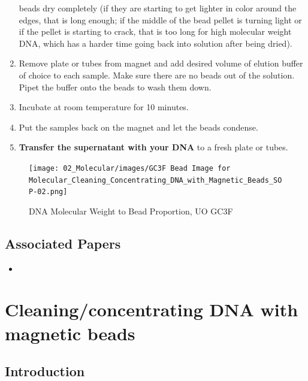 \documentclass[
  letterpaper,
  DIV=11,
  numbers=noendperiod]{scrreprt}
\providecommand{\tightlist}{%
  \setlength{\itemsep}{0pt}\setlength{\parskip}{0pt}}\usepackage{longtable,booktabs,array}
\begin{document}
\begin{enumerate}
  beads dry completely (if they are starting to get lighter in color
  around the edges, that is long enough; if the middle of the bead
  pellet is turning light or if the pellet is starting to crack, that is
  too long for high molecular weight DNA, which has a harder time going
  back into solution after being dried).
\item
  Remove plate or tubes from magnet and add desired volume of elution
  buffer of choice to each sample. Make sure there are no beads out of
  the solution. Pipet the buffer onto the beads to wash them down.
\item
  Incubate at room temperature for 10 minutes.
\item
  Put the samples back on the magnet and let the beads condense.
\item
  \textbf{Transfer the supernatant with your DNA} to a fresh plate or
  tubes.
\end{enumerate}

\begin{figure}

{\centering \texttt{[image: 02\_Molecular/images/GC3F Bead Image for Molecular\_Cleaning\_Concentrating\_DNA\_with\_Magnetic\_Beads\_SOP-02.png]}

}

\caption{DNA Molecular Weight to Bead Proportion, UO GC3F}

\end{figure}

\hypertarget{associated-papers-12}{%
\section{Associated Papers}\label{associated-papers-12}}

\begin{itemize}
\tightlist
\item
\end{itemize}

\hypertarget{sec-molecular-bead_extraction}{%
\chapter{Cleaning/concentrating DNA with magnetic
beads}\label{sec-molecular-bead_extraction}}

\hypertarget{introduction-20}{%
\section{Introduction}\label{introduction-20}}
\end{document}
